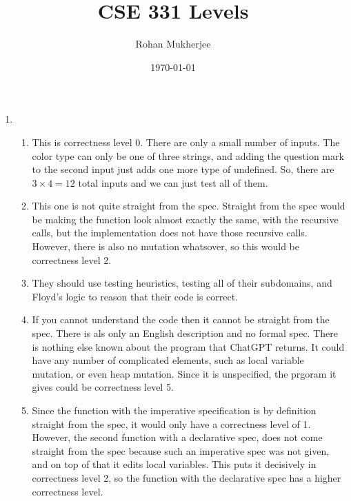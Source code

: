 \documentclass[12pt]{article}
\title{CSE 331 Levels}
\date{\today}
\author{Rohan Mukherjee}
\theoremstyle{definitionstyle}
\begin{document}
    \maketitle
    \begin{enumerate}[leftmargin=\labelsep]
        \item \begin{enumerate}[label=(\alph*)]
            \item This is correctness level 0. There are only a small number of inputs. The color type can only be one of three strings, and adding the question mark to the second input just adds one more type of undefined. So, there are $3 \times 4 = 12$ total inputs and we can just test all of them. 
            \item This one is not quite straight from the spec. Straight from the spec would be making the function look almost exactly the same, with the recursive calls, but the implementation does not have those recursive calls. However, there is also no mutation whatsover, so this would be correctness level 2.
            \item They should use testing heuristics, testing all of their subdomains, and Floyd's logic to reason that their code is correct.
            \item If you cannot understand the code then it cannot be straight from the spec. There is als only an English description and no formal spec. There is nothing else known about the program that ChatGPT returns. It could have any number of complicated elements, such as local variable mutation, or even heap mutation. Since it is unspecified, the prgoram it gives could be correctness level 5.
            \item Since the function with the imperative specification is by definition straight from the spec, it would only have a correctness level of 1. However, the second function with a declarative spec, does not come straight from the spec because such an imperative spec was not given, and on top of that it edits local variables. This puts it decisively in correctness level 2, so the function with the declarative spec has a higher correctness level. 
        \end{enumerate}
        

\end{enumerate}
\end{document}
